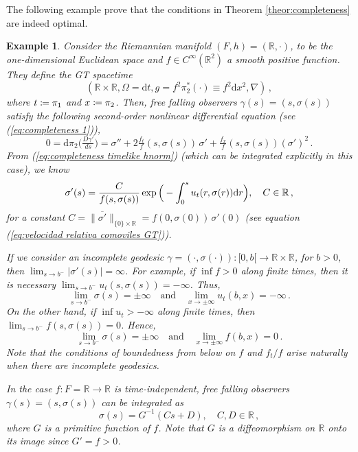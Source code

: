 \documentclass[12pt]{article}
\newcommand{\mfrac}[2]{\mbox{\footnotesize$\displaystyle\frac{#1}{#2}$}}
\newcommand{\diff}{\mathrm{d}}
\newcommand{\dt}{\diff t}
\newcommand{\tendsto}{\rightarrow}
\newcommand{\quand}{\quad\text{and}\quad}
\newcommand{\coloneq}{\vcentcolon\mathrel{\mkern -1.2mu}\mathrel{=}}
\newtheorem{ex}[defi]{Example}
\def\R{\mathbb R}
\begin{document}
The following example prove that the conditions in Theorem \ref{theor:completeness} are indeed optimal.
\begin{ex}
\upshape
    Consider the Riemannian manifold $(F,h) = (\R, \cdot)$, to be the one-dimensional Euclidean space and $f\in C^\infty(\R^2)$ a smooth positive function. They define the GT spacetime 
    $$(\R\times \R, \Omega=\dt, g=f^2 \pi_2^*(\cdot) \equiv f^2 \diff x^2, \nabla)\,, $$ where $t\coloneq \pi_1$ and $x\coloneq \pi_2$.
    Then, free falling observers $\gamma(s) = (s,\sigma(s))$ satisfy the following second-order nonlinear differential equation (see (\ref{eq:completeness 1})), 
    \begin{equation*}
        0 = \diff \pi_2\big(\tfrac{D\gamma'}{ds}\big) = \sigma'' + 2\tfrac{f_t}{f}(s,\sigma(s))\,\sigma' + \tfrac{f_x}{f}(s,\sigma(s)) (\sigma')^2 \,.
    \end{equation*}
    From (\ref{eq:completeness timelike hnorm}) (which can be integrated explicitly in this case), we know 
    \begin{equation}
        \sigma'(s) = \mfrac{C}{f(s,\sigma(s))} \exp\Big(-\int_0^s u_t(r,\sigma(r)) \diff r\Big), \quad C\in \R\,,
    \end{equation}
    for a constant $C=\big\|\overline{\sigma'}\big\|_{\{0\}\times \R} = f(0,\sigma(0))\, \sigma'(0)$ (see equation (\ref{eq:velocidad relativa comoviles GT})).

    If we consider an incomplete geodesic $\gamma=(\cdot,\sigma(\cdot))\colon [0,b[\to \R\times \R$, for $b>0$, then $\lim_{s\tendsto b^-} |\sigma' (s)| = \infty$. For example, if $\inf f>0$ along finite times, then it is necessary $\lim_{s\tendsto b^-} u_t(s,\sigma(s)) = -\infty$. Thus,
    \[
        \lim_{s\tendsto b^-} \sigma(s) = \pm\infty \quand \lim_{x\tendsto\pm \infty}u_t(b,x) = -\infty\,.
    \]
    On the other hand, if $\inf u_t >-\infty$ along finite times, then $\lim_{s\tendsto b^-} f(s,\sigma(s)) = 0$. Hence, 
    \[
        \lim_{s\tendsto b^-} \sigma(s) = \pm\infty \quand \lim_{x\tendsto\pm \infty}f(b,x) = 0\,.
    \]
    Note that the conditions of boundedness from below on $f$ and $f_t/f$ arise naturally when there are incomplete geodesics. 

    In the case $f\colon F=\R \to \R$ is time-independent, free falling observers $\gamma(s) = (s,\sigma(s))$ can be integrated as
    \begin{equation}\label{eq:example completeness 2}
        \sigma(s) = G^{-1}(Cs+D), \quad C,D\in \R\,,
    \end{equation}
    where $G$ is a primitive function of $f$. Note that $G$ is a diffeomorphism on $\R$ onto its image since $G' = f >0$. 


\end{ex}
\end{document}
